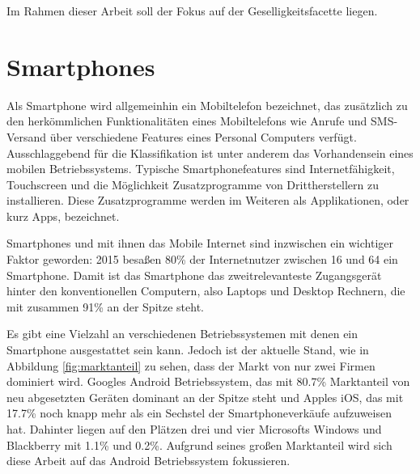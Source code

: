 Im Rahmen dieser Arbeit soll der Fokus auf der Geselligkeitsfacette liegen.

\section{Smartphones}

\label{ch:Grundlagen:sec:Abschnitt2}


Als Smartphone wird allgemeinhin ein Mobiltelefon bezeichnet, das zusätzlich zu den herkömmlichen Funktionalitäten eines Mobiltelefons wie Anrufe und SMS-Versand über verschiedene Features eines Personal Computers verfügt. 
Ausschlaggebend für die Klassifikation ist unter anderem das Vorhandensein eines mobilen Betriebssystems.
Typische Smartphonefeatures sind Internetfähigkeit, Touchscreen und die Möglichkeit Zusatzprogramme von Drittherstellern zu installieren.
Diese Zusatzprogramme werden im Weiteren als Applikationen, oder kurz Apps, bezeichnet.
\par

Smartphones und mit ihnen das Mobile Internet sind inzwischen ein wichtiger Faktor geworden:
2015 besaßen 80\% der Internetnutzer zwischen 16 und 64 ein Smartphone. 
Damit ist das Smartphone das zweitrelevanteste Zugangsgerät hinter den konventionellen Computern, also Laptops und Desktop Rechnern, die mit zusammen 91\% an der Spitze steht\cite{globalwebindex}.
\par

Es gibt eine Vielzahl an verschiedenen Betriebssystemen mit denen ein Smartphone ausgestattet sein kann.
Jedoch ist der aktuelle Stand, wie in Abbildung \ref{fig:marktanteil} zu sehen, dass der Markt von nur zwei Firmen dominiert wird.
Googles Android Betriebssystem, das mit 80.7\% Marktanteil von neu abgesetzten Geräten dominant an der Spitze steht
und Apples iOS, das mit 17.7\% noch knapp mehr als ein Sechstel der Smartphoneverkäufe aufzuweisen hat.
Dahinter liegen auf den Plätzen drei und vier Microsofts Windows und Blackberry mit 1.1\% und 0.2\%\cite{smartphonemarktanteil}.
Aufgrund seines großen Marktanteil wird sich diese Arbeit auf das Android Betriebssystem fokussieren.

